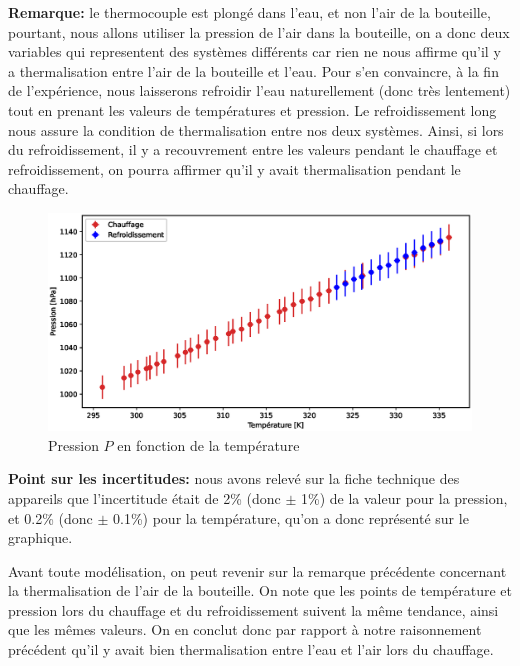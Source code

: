 \documentclass[12pt]{article}
\begin{document}
\newpage
\textbf{Remarque:} le thermocouple est plongé dans l'eau, et non l'air de la bouteille, pourtant, nous allons utiliser la pression de l'air dans
la bouteille, on a donc deux variables qui representent des systèmes différents car rien ne nous affirme qu'il y a thermalisation entre l'air de la bouteille et l'eau.
Pour s'en convaincre, à la fin de l'expérience, nous laisserons refroidir l'eau naturellement (donc très lentement) tout en prenant les valeurs de températures et pression. 
Le refroidissement long nous assure la condition de thermalisation entre nos deux systèmes. Ainsi, si lors du refroidissement, il y a recouvrement entre les valeurs pendant le chauffage et 
refroidissement, on pourra affirmer qu'il y avait thermalisation pendant le chauffage.

\begin{figure}[!h]
	\begin{center}
		\includegraphics[scale=0.68]{img/exp2_graph1.eps}
		\caption{Pression $P$ en fonction de la température}
	\end{center}
	\label{Exp2_graph1}
\end{figure}

\textbf{Point sur les incertitudes:} nous avons relevé sur la fiche technique des appareils que l'incertitude était de 2\% (donc $\pm$ 1\%) de la valeur pour la pression, et 0.2\% (donc $\pm$ 0.1\%) pour la température, qu'on a donc représenté sur
le graphique.

Avant toute modélisation, on peut revenir sur la remarque précédente concernant la thermalisation de l'air de la bouteille. On note que les points de température et pression lors du chauffage et 
du refroidissement suivent la même tendance, ainsi que les mêmes valeurs. On en conclut donc par rapport à notre raisonnement précédent qu'il y avait bien thermalisation entre l'eau et l'air lors du chauffage.
\end{document}
